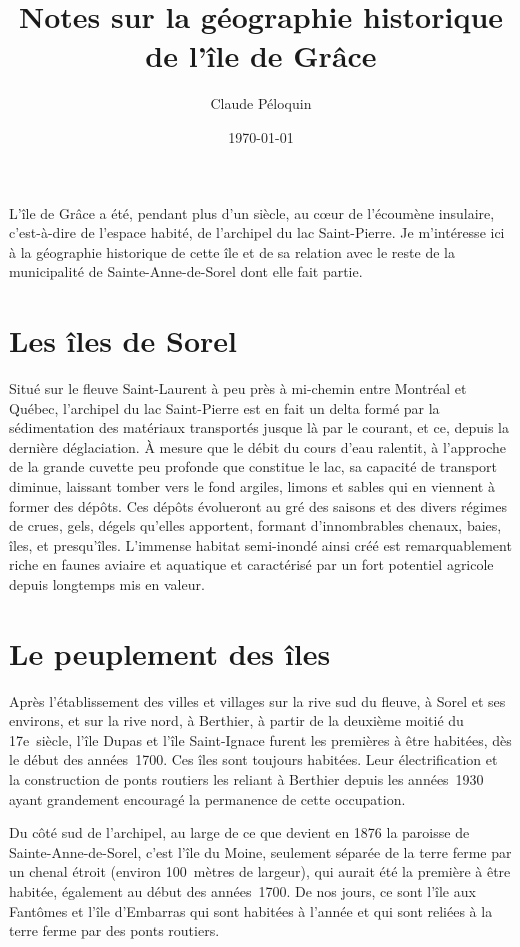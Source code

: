 \documentclass[12pt]{article}
\title{\textbf{Notes sur la géographie historique de l'île de Grâce}}
\author{Claude Péloquin}
\date{\today}
\begin{document}
\maketitle
L'île de Grâce a été, pendant plus d'un siècle, au cœur de l'écoumène insulaire, c'est-à-dire de l'espace habité, de l'archipel du lac Saint-Pierre. Je m'intéresse ici à la géographie historique de cette île et de sa relation avec le reste de la municipalité de Sainte-Anne-de-Sorel dont elle fait partie.  

\section*{Les îles de Sorel}

Situé sur le fleuve Saint-Laurent à peu près à mi-chemin entre Montréal et Québec, l'archipel du lac Saint-Pierre est en fait un delta formé par la sédimentation des matériaux transportés jusque là par le courant, et ce, depuis la dernière déglaciation. À mesure que le débit du cours d'eau ralentit, à l'approche de la grande cuvette peu profonde que constitue le lac, sa capacité de transport diminue, laissant tomber vers le fond argiles, limons et sables qui en viennent à former des dépôts. Ces dépôts évolueront au gré des saisons et des divers régimes de crues, gels, dégels qu'elles apportent, formant d'innombrables chenaux, baies, îles, et presqu'îles. L'immense habitat semi-inondé ainsi créé est remarquablement riche en faunes aviaire et aquatique et caractérisé par un fort potentiel agricole depuis longtemps mis en valeur.  



\section*{Le peuplement des îles}

Après l'établissement des villes et villages sur la rive sud du fleuve, à Sorel et ses environs, et sur la rive nord, à Berthier, à partir de la deuxième moitié du 17e siècle, l'île Dupas et l'île Saint-Ignace furent les premières à être habitées, dès le début des années 1700. Ces îles sont toujours habitées. Leur électrification et la construction de ponts routiers les reliant à Berthier depuis les années 1930 ayant grandement encouragé la permanence de cette occupation. 

Du côté sud de l'archipel, au large de ce que devient en 1876 la paroisse de Sainte-Anne-de-Sorel, c'est l'île du Moine, seulement séparée de la terre ferme par un chenal étroit (environ 100 mètres de largeur), qui aurait été la première à être habitée, également au début des années 1700. De nos jours, ce sont l'île aux Fantômes et l'île d'Embarras qui sont habitées à l'année et qui sont reliées à la terre ferme par des ponts routiers.
\end{document}
